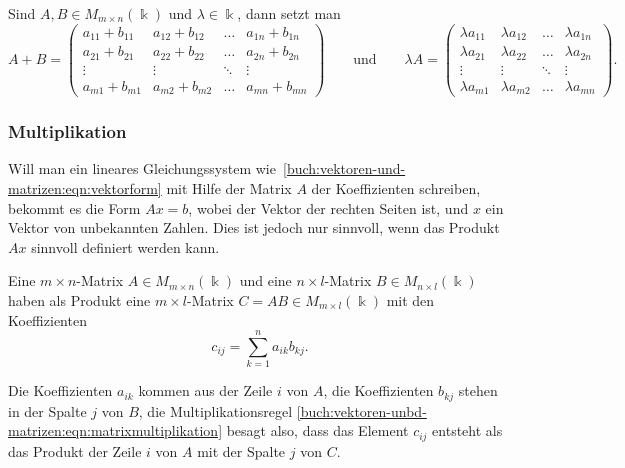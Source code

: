 \begin{definition}
Sind $A,B\in M_{m\times n}(\Bbbk)$ und $\lambda\in\Bbbk$, dann setzt man
\[
A+B
=
\begin{pmatrix}
a_{11}+b_{11}&a_{12}+b_{12}&\dots &a_{1n}+b_{1n}\\
a_{21}+b_{21}&a_{22}+b_{22}&\dots &a_{2n}+b_{2n}\\
\vdots       &\vdots       &\ddots&\vdots       \\
a_{m1}+b_{m1}&a_{m2}+b_{m2}&\dots &a_{mn}+b_{mn}
\end{pmatrix}
\qquad\text{und}\qquad
\lambda A
=
\begin{pmatrix}
\lambda a_{11}&\lambda a_{12}&\dots &\lambda a_{1n}\\
\lambda a_{21}&\lambda a_{22}&\dots &\lambda a_{2n}\\
\vdots        &\vdots        &\ddots&\vdots        \\
\lambda a_{m1}&\lambda a_{m2}&\dots &\lambda a_{mn}
\end{pmatrix}.
\]
\end{definition}

\subsubsection{Multiplikation}
Will man ein lineares Gleichungssystem
wie~\eqref{buch:vektoren-und-matrizen:eqn:vektorform}
mit Hilfe der Matrix $A$ der
Koeffizienten schreiben, bekommt es die Form $Ax=b$, wobei der Vektor
der rechten Seiten ist, und $x$ ein Vektor von unbekannten Zahlen.
Dies ist jedoch nur sinnvoll, wenn das Produkt $Ax$ sinnvoll definiert
werden kann.

\begin{definition}
\label{buch:vektoren-und-matrizen:def:matrixmultiplikation}
Eine $m\times n$-Matrix $A\in M_{m\times n}(\Bbbk)$ und eine
$n\times l$-Matrix $B\in M_{n\times l}(\Bbbk)$ haben als Produkt
eine $m\times l$-Matrix $C=AB\in M_{m\times l}(\Bbbk)$ mit den
Koeffizienten
\begin{equation}
c_{ij} = \sum_{k=1}^n a_{ik} b_{kj}.
\label{buch:vektoren-und-matrizen:eqn:matrixmultiplikation}
\end{equation}
\end{definition}

Die Koeffizienten $a_{ik}$ kommen aus der Zeile $i$ von $A$, die Koeffizienten
$b_{kj}$ stehen in der Spalte $j$ von $B$, die Multiplikationsregel
\eqref{buch:vektoren-unbd-matrizen:eqn:matrixmultiplikation}
besagt also, dass das Element $c_{ij}$ entsteht als das Produkt
der Zeile $i$ von $A$ mit der Spalte $j$ von $C$.

